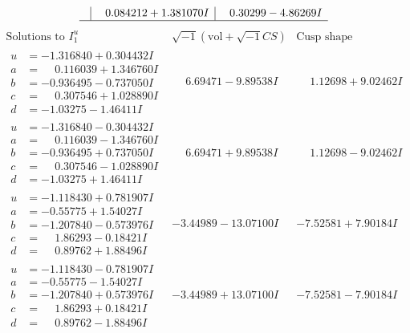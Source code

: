 \documentclass[1p]{elsarticle_modified}
\theoremstyle{definition}
\newcommand{\I}{\sqrt{-1}}
\begin{document}
$$\begin{array}{c|c|c}
 & \phantom{-}0.084212 + 1.381070 I & \phantom{-}0.30299 - 4.86269 I\\
 \hline 
 \end{array}$$\newpage$$\begin{array}{c|c|c}  
\text{Solutions to }I^u_{1}& \I (\text{vol} + \sqrt{-1}CS) & \text{Cusp shape}\\
 \hline 
\begin{aligned}
u &= -1.316840 + 0.304432 I \\
a &= \phantom{-}0.116039 + 1.346760 I \\
b &= -0.936495 - 0.737050 I \\
c &= \phantom{-}0.307546 + 1.028890 I \\
d &= -1.03275 - 1.46411 I\end{aligned}
 & \phantom{-}6.69471 - 9.89538 I & \phantom{-}1.12698 + 9.02462 I \\ \hline\begin{aligned}
u &= -1.316840 - 0.304432 I \\
a &= \phantom{-}0.116039 - 1.346760 I \\
b &= -0.936495 + 0.737050 I \\
c &= \phantom{-}0.307546 - 1.028890 I \\
d &= -1.03275 + 1.46411 I\end{aligned}
 & \phantom{-}6.69471 + 9.89538 I & \phantom{-}1.12698 - 9.02462 I \\ \hline\begin{aligned}
u &= -1.118430 + 0.781907 I \\
a &= -0.55775 + 1.54027 I \\
b &= -1.207840 - 0.573976 I \\
c &= \phantom{-}1.86293 - 0.18421 I \\
d &= \phantom{-}0.89762 + 1.88496 I\end{aligned}
 & -3.44989 - 13.07100 I & -7.52581 + 7.90184 I \\ \hline\begin{aligned}
u &= -1.118430 - 0.781907 I \\
a &= -0.55775 - 1.54027 I \\
b &= -1.207840 + 0.573976 I \\
c &= \phantom{-}1.86293 + 0.18421 I \\
d &= \phantom{-}0.89762 - 1.88496 I\end{aligned}
 & -3.44989 + 13.07100 I & -7.52581 - 7.90184 I \\ \hline\begin{aligned}

\end{aligned}
\end{array}$$
\end{document}
